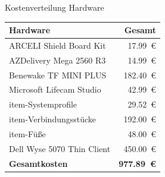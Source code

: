 \documentclass[10pt,ngerman]{beamer}
\begin{document}


\begin{frame}[fragile]{Kostenverteilung Hardware}
  \begin{table}[htbp]
    \centering
    \begin{tabular}{lr}
      \textbf{Hardware}          & \textbf{Gesamt}         \\ \hline
      ARCELI Shield Board Kit    & \SI{17.99}{€}           \\
      AZDelivery Mega 2560 R3    & \SI{14.99}{€}           \\
      Benewake TF MINI PLUS      & \SI{182.40}{€}          \\
      Microsoft Lifecam Studio   & \SI{42.99}{€}           \\
      item-Systemprofile         & \SI{29.52}{€}           \\
      item-Verbindungsstücke     & \SI{192.00}{€}          \\
      item-Füße                  & \SI{48.00}{€}           \\
      Dell Wyse 5070 Thin Client & \SI{450.00}{€}          \\
      \hline
      \textbf{Gesamtkosten}      & \textbf{\SI{977.89}{€}}
    \end{tabular}
  \end{table}
\end{frame}

\end{document}
